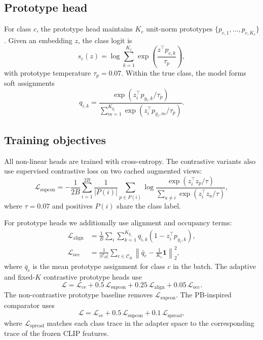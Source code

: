 \documentclass[10pt,twocolumn]{article}
\begin{document}
\subsection{Prototype head}
For class $c$, the prototype head maintains $K_c$ unit-norm prototypes $\{p_{c,1},\dots,p_{c,K_c}\}$. Given an embedding $z$, the class logit is
\begin{equation}
s_c(z) = \log \sum_{k=1}^{K_c} \exp \left(\frac{z^\top p_{c,k}}{\tau_p}\right),
\end{equation}
with prototype temperature $\tau_p = 0.07$. Within the true class, the model forms soft assignments
\begin{equation}
q_{i,k} =
\frac{\exp(z_i^\top p_{y_i,k}/\tau_p)}
{\sum_{m=1}^{K_{y_i}} \exp(z_i^\top p_{y_i,m}/\tau_p)}.
\end{equation}

\subsection{Training objectives}
All non-linear heads are trained with cross-entropy. The contrastive variants also use supervised contrastive loss on two cached augmented views:
\begin{equation}
\mathcal{L}_{\mathrm{supcon}} =
- \frac{1}{2B} \sum_{i=1}^{2B}
\frac{1}{|P(i)|}
\sum_{p \in P(i)}
\log \frac{\exp(z_i^\top z_p / \tau)}
{\sum_{a \neq i} \exp(z_i^\top z_a / \tau)},
\end{equation}
where $\tau = 0.07$ and positives $P(i)$ share the class label.

For prototype heads we additionally use alignment and occupancy terms:
\begin{align}
\mathcal{L}_{\mathrm{align}} &= \frac{1}{B}\sum_i \sum_{k=1}^{K_{y_i}} q_{i,k}(1 - z_i^\top p_{y_i,k}), \\
\mathcal{L}_{\mathrm{occ}} &= \frac{1}{|\mathcal{C}_B|}\sum_{c \in \mathcal{C}_B}
\left\| \bar{q}_c - \frac{1}{K_c}\mathbf{1}\right\|_2^2,
\end{align}
where $\bar{q}_c$ is the mean prototype assignment for class $c$ in the batch. The adaptive and fixed-$K$ contrastive prototype heads use
\begin{equation}
\mathcal{L} =
\mathcal{L}_{\mathrm{ce}}
+ 0.5\,\mathcal{L}_{\mathrm{supcon}}
+ 0.25\,\mathcal{L}_{\mathrm{align}}
+ 0.05\,\mathcal{L}_{\mathrm{occ}}.
\end{equation}
The non-contrastive prototype baseline removes $\mathcal{L}_{\mathrm{supcon}}$. The PB-inspired comparator uses
\begin{equation}
\mathcal{L} =
\mathcal{L}_{\mathrm{ce}}
+ 0.5\,\mathcal{L}_{\mathrm{supcon}}
+ 0.1\,\mathcal{L}_{\mathrm{spread}},
\end{equation}
where $\mathcal{L}_{\mathrm{spread}}$ matches each class trace in the adapter space to the corresponding trace of the frozen CLIP features.
\end{document}
